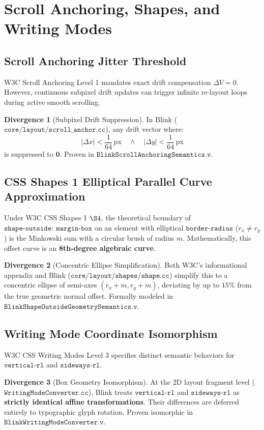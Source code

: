 \documentclass[11pt,a4paper]{article}
\theoremstyle{definition}
\newtheorem{divergence}{Divergence}[section]
\begin{document}
\section{Scroll Anchoring, Shapes, and Writing Modes}

\subsection{Scroll Anchoring Jitter Threshold}
W3C Scroll Anchoring Level 1 mandates exact drift compensation $\Delta V = 0$. However, continuous subpixel drift updates can trigger infinite re-layout loops during active smooth scrolling.
\begin{divergence}[Subpixel Drift Suppression]
In Blink ($\mathtt{core/layout/scroll\_anchor.cc}$), any drift vector where:
\begin{equation}
    |\Delta x| < \frac{1}{64}\,\text{px} \quad \land \quad |\Delta y| < \frac{1}{64}\,\text{px}
\end{equation}
is suppressed to $\mathbf{0}$. Proven in $\mathtt{BlinkScrollAnchoringSemantics.v}$.
\end{divergence}

\subsection{CSS Shapes 1 Elliptical Parallel Curve Approximation}
Under W3C CSS Shapes 1 $\S 4$, the theoretical boundary of $\mathtt{shape\text{-}outside:\ margin\text{-}box}$ on an element with elliptical $\mathtt{border\text{-}radius}$ ($r_x \neq r_y$) is the Minkowski sum with a circular brush of radius $m$. Mathematically, this offset curve is an \textbf{8th-degree algebraic curve}.
\begin{divergence}[Concentric Ellipse Simplification]
Both W3C's informational appendix and Blink ($\mathtt{core/layout/shapes/shape.cc}$) simplify this to a concentric ellipse of semi-axes $(r_x + m, r_y + m)$, deviating by up to $15\%$ from the true geometric normal offset. Formally modeled in $\mathtt{BlinkShapeOutsideGeometrySemantics.v}$.
\end{divergence}

\subsection{Writing Mode Coordinate Isomorphism}
W3C CSS Writing Modes Level 3 specifies distinct semantic behaviors for $\mathtt{vertical\text{-}rl}$ and $\mathtt{sideways\text{-}rl}$.
\begin{divergence}[Box Geometry Isomorphism]
At the 2D layout fragment level ($\mathtt{WritingModeConverter.cc}$), Blink treats $\mathtt{vertical\text{-}rl}$ and $\mathtt{sideways\text{-}rl}$ as \textbf{strictly identical affine transformations}. Their differences are deferred entirely to typographic glyph rotation. Proven isomorphic in $\mathtt{BlinkWritingModeConverter.v}$.
\end{divergence}
\end{document}

